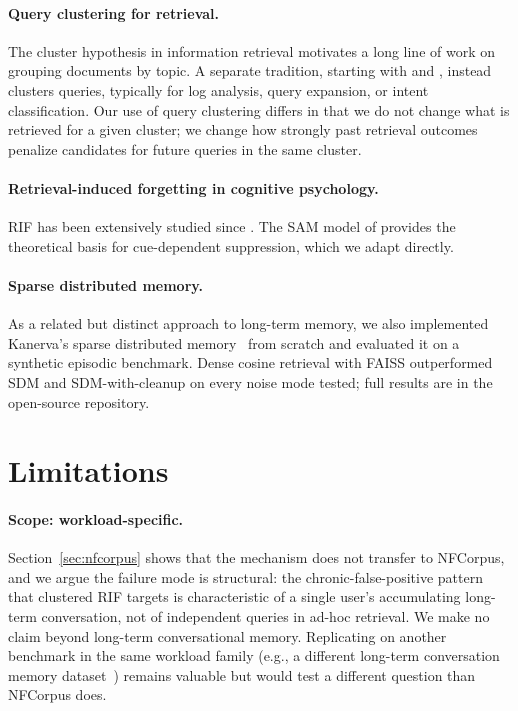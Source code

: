\documentclass[11pt,a4paper]{article}
\begin{document}
\paragraph{Query clustering for retrieval.} The cluster hypothesis in information retrieval \citep{vanrijsbergen1979information} motivates a long line of work on grouping documents by topic. A separate tradition, starting with \citet{beeferman2000agglomerative} and \citet{wen2002clustering}, instead clusters queries, typically for log analysis, query expansion, or intent classification. Our use of query clustering differs in that we do not change what is retrieved for a given cluster; we change how strongly past retrieval outcomes penalize candidates for future queries in the same cluster.

\paragraph{Retrieval-induced forgetting in cognitive psychology.} RIF has been extensively studied since \citet{anderson1994rif}. The SAM model of \citet{raaijmakers1981sam} provides the theoretical basis for cue-dependent suppression, which we adapt directly.

\paragraph{Sparse distributed memory.} As a related but distinct approach to long-term memory, we also implemented Kanerva's sparse distributed memory~\citep{kanerva1988sdm} from scratch and evaluated it on a synthetic episodic benchmark. Dense cosine retrieval with FAISS outperformed SDM and SDM-with-cleanup on every noise mode tested; full results are in the open-source repository.

\section{Limitations}
\label{sec:limitations}

\paragraph{Scope: workload-specific.} Section~\ref{sec:nfcorpus} shows that the mechanism does not transfer to NFCorpus, and we argue the failure mode is structural: the chronic-false-positive pattern that clustered RIF targets is characteristic of a single user's accumulating long-term conversation, not of independent queries in ad-hoc retrieval. We make no claim beyond long-term conversational memory. Replicating on another benchmark in the same workload family (e.g., a different long-term conversation memory dataset~\citep{yang2018hotpotqa}) remains valuable but would test a different question than NFCorpus does.
\end{document}
